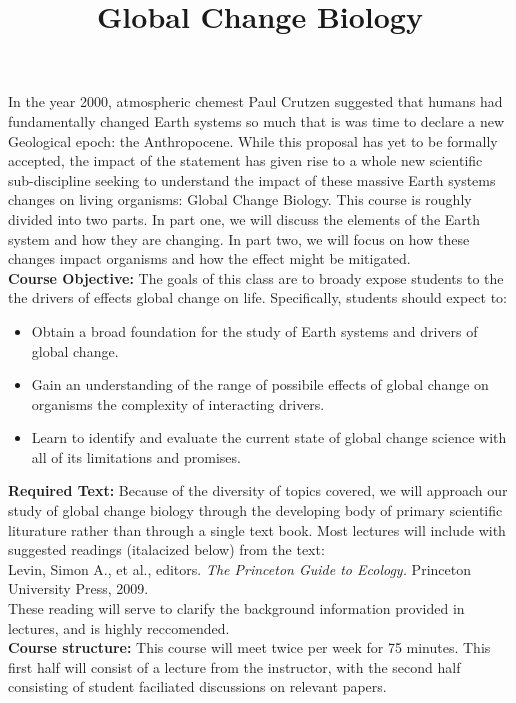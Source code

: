 \documentclass{article}\usepackage[]{graphicx}\usepackage[]{color}
\begin{document}
\title{Global Change Biology}
\date{}
\maketitle{}
\indent In the year 2000, atmospheric chemest Paul Crutzen suggested that humans had fundamentally changed Earth systems so much that is was time to declare a new Geological epoch: the Anthropocene. While this proposal has yet to be formally accepted, the impact of the statement has given rise to a whole new scientific sub-discipline seeking to understand the impact of these massive Earth systems changes on living organisms: Global Change Biology. This course is roughly divided into two parts. In part one, we will discuss the elements of the Earth system and how they are changing. In part two, we will focus on how these changes impact organisms and how the effect might be mitigated. \\

\indent\textbf{Course Objective:} The goals of this class are to broady expose students to the the  drivers of effects global change on life. Specifically, students should expect to:
\begin{itemize}
\item Obtain a broad foundation for the study of Earth systems and drivers of global change.
\item Gain an understanding of the range of possibile effects of global change on organisms the complexity of interacting drivers.
\item Learn to identify and evaluate the current state of global change science with all of its limitations and promises.
\end{itemize}

\textbf{Required Text:} Because of the diversity of topics covered, we will approach our study of global change biology through the developing body of primary scientific liturature rather than through a single text book. Most lectures will include with suggested readings (italacized below) from the text:\\
\indent Levin, Simon A., et al., editors. \textit{The Princeton Guide to Ecology.} Princeton University Press, 2009.\\
These reading will serve to clarify the background information provided in lectures, and is highly reccomended.\\

\textbf{Course structure:} This course will meet twice per week for 75 minutes. This first half will consist of a lecture from the instructor, with the second half consisting of student faciliated discussions on relevant papers.\\
\end{document}
